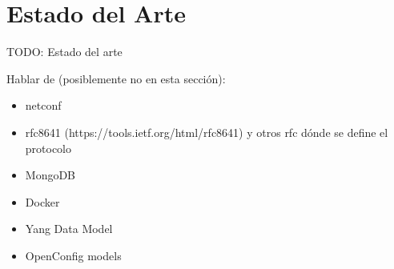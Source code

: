 \chapter{Estado del Arte\label{sec:estado_del_arte}}

TODO: Estado del arte

Hablar de (posiblemente no en esta sección):

\begin{itemize}
  \item netconf
  \item rfc8641 (https://tools.ietf.org/html/rfc8641) y otros rfc dónde se define el protocolo
  \item MongoDB
  \item Docker
  \item Yang Data Model
  \item OpenConfig models
\end{itemize}  



